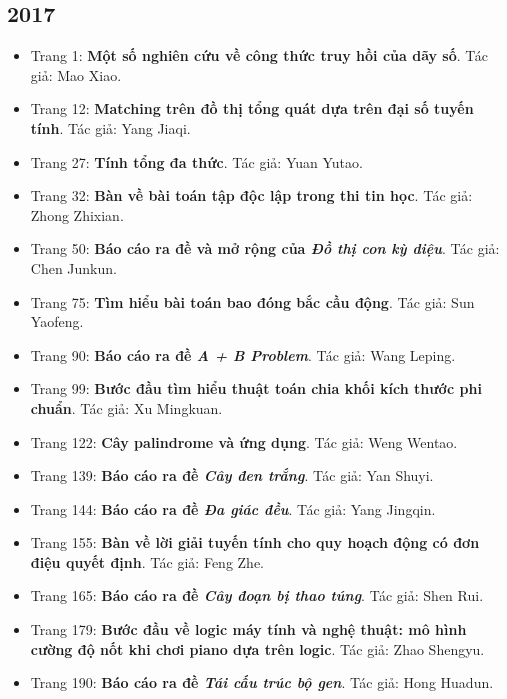 \documentclass[11pt]{article}
\begin{document}
\subsection{2017}
\begin{itemize}[leftmargin=2em]
  \item Trang 1: \textbf{Một số nghiên cứu về công thức truy hồi của dãy số}. Tác giả: Mao Xiao.
  \item Trang 12: \textbf{Matching trên đồ thị tổng quát dựa trên đại số tuyến tính}. Tác giả: Yang Jiaqi.
  \item Trang 27: \textbf{Tính tổng đa thức}. Tác giả: Yuan Yutao.
  \item Trang 32: \textbf{Bàn về bài toán tập độc lập trong thi tin học}. Tác giả: Zhong Zhixian.
  \item Trang 50: \textbf{Báo cáo ra đề và mở rộng của \emph{Đồ thị con kỳ diệu}}. Tác giả: Chen Junkun.
  \item Trang 75: \textbf{Tìm hiểu bài toán bao đóng bắc cầu động}. Tác giả: Sun Yaofeng.
  \item Trang 90: \textbf{Báo cáo ra đề \emph{A + B Problem}}. Tác giả: Wang Leping.
  \item Trang 99: \textbf{Bước đầu tìm hiểu thuật toán chia khối kích thước phi chuẩn}. Tác giả: Xu Mingkuan.
  \item Trang 122: \textbf{Cây palindrome và ứng dụng}. Tác giả: Weng Wentao.
  \item Trang 139: \textbf{Báo cáo ra đề \emph{Cây đen trắng}}. Tác giả: Yan Shuyi.
  \item Trang 144: \textbf{Báo cáo ra đề \emph{Đa giác đều}}. Tác giả: Yang Jingqin.
  \item Trang 155: \textbf{Bàn về lời giải tuyến tính cho quy hoạch động có đơn điệu quyết định}. Tác giả: Feng Zhe.
  \item Trang 165: \textbf{Báo cáo ra đề \emph{Cây đoạn bị thao túng}}. Tác giả: Shen Rui.
  \item Trang 179: \textbf{Bước đầu về logic máy tính và nghệ thuật: mô hình cường độ nốt khi chơi piano dựa trên logic}. Tác giả: Zhao Shengyu.
  \item Trang 190: \textbf{Báo cáo ra đề \emph{Tái cấu trúc bộ gen}}. Tác giả: Hong Huadun.
\end{itemize}
\end{document}
